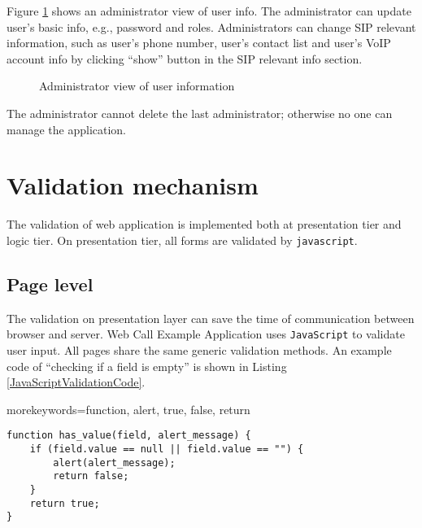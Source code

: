 Figure \ref{fig:AdministratorViewOfUserInformation} shows an administrator view of user info. The administrator can update user's basic info, e.g., password and roles. Administrators can change SIP relevant information, such as user's phone number, user's contact list and user's VoIP account info by clicking ``show'' button in the SIP relevant info section.

\begin{figure}[!hbtp]
\centering
{}
\caption{Administrator view of user information}
\label{fig:AdministratorViewOfUserInformation}
\end{figure} 

The administrator cannot delete the last administrator; otherwise no one can manage the application. 

\section{Validation mechanism}
\label{sec:WebApplication:ValidationMechanism}

The validation of web application is implemented both at presentation tier and logic tier. On presentation tier, all forms are validated by \texttt{javascript}. 

\subsection{Page level}
\label{sec:WebApplication:ValidationMechanism:PageLevel}

The validation on presentation layer can save the time of communication between browser and server. Web Call Example Application uses \texttt{JavaScript} to validate user input. All pages share the same generic validation methods. An example code of ``checking if a field is empty'' is shown in Listing \ref{JavaScriptValidationCode}.

{morekeywords={function, alert, true, false, return}}
\lstset{language=Java}

\begin{lstlisting}[frame=lines, float=!bph, caption=JavaScript validation code, label=JavaScriptValidationCode]
function has_value(field, alert_message) {
    if (field.value == null || field.value == "") {
        alert(alert_message);
        return false;
    }
    return true;
}
\end{lstlisting}

